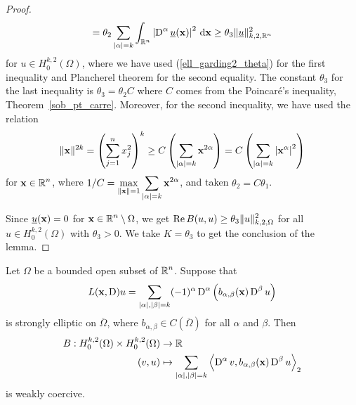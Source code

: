 \begin{proof}
\begin{align*}
= \theta_2 \sum_{|\alpha|=k} \int_{\mathbb{R}^n}
\left| \operatorname{D}^\alpha \underline{u}(\mathbf{x}) \right|^2 \,\mathrm{d}{\mathbf{x}}
\geq \theta_3 \| \underline{u} \|_{k,2,\mathbb{R}^n}^2             
\end{align*}
for $\displaystyle u \in H^{k,2}_0(\Omega)$, where
we have used (\ref{ell_garding2_theta}) for the first inequality and
Plancherel theorem for the second equality.  The constant $\theta_3$
for the last inequality is $\theta_3 = \theta_2 C$ where $C$ comes
from the Poincaré's inequality, Theorem~\ref{sob_pt_carre}.
Moreover, for the second inequality, we have used the relation
\[
\| \mathbf{x} \|^{2k} = \left( \sum_{j=1}^n x_j^2 \right)^{k}
\geq C \left( \sum_{|\alpha|=k} \mathbf{x}^{2\alpha} \right)
= C \left( \sum_{|\alpha|=k} \left|\mathbf{x}^\alpha\right|^2 \right)
\]
for $\displaystyle \mathbf{x} \in \mathbb{R}^n$,
where $\displaystyle 1/C = \max_{\|\mathbf{x}\|=1}
\sum_{|\alpha|=k} \mathbf{x}^{2\alpha}$,
and taken $\theta_2 = C \theta_1$.

Since $\underline{u}(\mathbf{x}) = 0$ for
$\displaystyle \mathbf{x} \in \mathbb{R}^n \setminus \Omega$, we get
$\displaystyle \operatorname{Re} B(u,u) \geq \theta_3 \|u\|_{k,2,\Omega}^2$ for all
$\displaystyle u \in H^{k,2}_0(\Omega)$ with $\theta_3>0$.  We take
$K=\theta_3$ to get the conclusion of the lemma.
\end{proof}

\begin{lemma} \label{ell_garding3}
Let $\Omega$ be a bounded open subset of $\displaystyle \mathbb{R}^n$.  Suppose that
\[
L(\mathbf{x},\operatorname{D})u = \sum_{|\alpha|,|\beta|= k} (-1)^\alpha \operatorname{D}^\alpha
\left( b_{\alpha,\beta}(\mathbf{x}) \operatorname{D}^\beta u\right)
\]
is strongly elliptic on $\overline{\Omega}$, where
$b_{\alpha,\beta} \in C(\overline{\Omega})$ for all
$\alpha$ and $\beta$.  Then
\[
\begin{split}
B : H^{k,2}_0(\Omega) \times H^{k,2}_0(\Omega) & \rightarrow \mathbb{R} \\
(v,u) &\mapsto
\sum_{|\alpha|,|\beta|= k}
\left\langle{\operatorname{D}^\alpha v} , {b_{\alpha,\beta}(\mathbf{x}) \operatorname{D}^\beta u}\right\rangle_2
\end{split}
\]
is weakly coercive.
\end{lemma}

